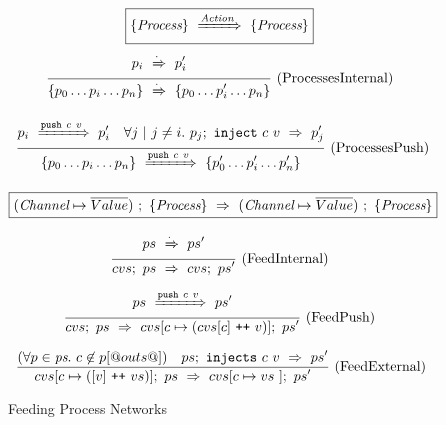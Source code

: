 
\begin{figure}

$$
  \boxed{\{ \textit{Process} \}~\xRightarrow{\textit{Action}}~\{ \textit{Process} \}}
$$
$$
\ruleIN{
  \ProcShake{p_i}{\cdot}{p'_i}
}{
  \ProcsShake{
    \sgl{p_0 \ldots p_i \ldots p_n}
  }{\cdot}{
    \sgl{p_0 \ldots p'_i \ldots p_n}
  }
}{ProcessesInternal}
$$

$$
\ruleIN{
  \ProcShake{p_i}{\Push~c~v}{p'_i}
  \quad
  \forall j~|~j \neq i.~
  \ProcInject{p_j}{c}{v}{p'_j}
}{
  \ProcsShake{
    \sgl{p_0 \ldots p_i \ldots p_n}
  }{\Push~c~v}{
    \sgl{p'_0 \ldots p'_i \ldots p'_n}
  }
}{ProcessesPush}
$$


\vspace{2em}
$$
  \boxed{
    (\textit{Channel} \mapsto \overline{Value})~;~\{ \textit{Process} \}~\Rightarrow~(\textit{Channel} \mapsto \overline{Value})~;~\{ \textit{Process} \}
  }
$$

\newcommand\vs {\ti{vs}}
\newcommand\accs {\ti{accs}}
\newcommand\network {\ti{ps}}



$$
\enskip \frac {\displaystyle 
  ps~\xRightarrow{\cdot}~ps'
} {\displaystyle 
  cvs;~ps~\Rightarrow~cvs;~ps'
} \  \mbox{(FeedInternal)} \enskip
$$




$$
\enskip \frac {\displaystyle 
  ps~\xRightarrow{\texttt{push}~c~v}~ps'
} {\displaystyle 
  cvs;~ps~\Rightarrow~cvs[c \mapsto (cvs[c] ~\texttt{++}~ v)];~ps'
} \  \mbox{(FeedPush)} \enskip
$$




$$
\ruleIN{
  (\forall p \in \network.~c \not\in p[@outs@])
\quad
  \ProcsInject
    {ps}
    {c}
    {v}
    {ps'}
}{
  \ProcsFeed
    {cvs[c \mapsto ([v] \listappend vs)]}
    {ps}
    {cvs[c \mapsto vs~]}
    {ps'}
}{FeedExternal}
$$



\caption{Feeding Process Networks}
\label{fig:Process:Eval:Feed}
\end{figure}


